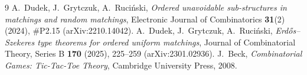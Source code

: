 \documentclass[11pt]{article}
\theoremstyle{definition}
\theoremstyle{plain}
\theoremstyle{remark}
\begin{document}
\begin{thebibliography}{9}
A.~Dudek, J.~Grytczuk, A.~Ruciński,
\emph{Ordered unavoidable sub-structures in matchings and random matchings},
Electronic Journal of Combinatorics \textbf{31}(2) (2024), \#P2.15 (arXiv:2210.14042).
A.~Dudek, J.~Grytczuk, A.~Ruciński,
\emph{Erdős--Szekeres type theorems for ordered uniform matchings},
Journal of Combinatorial Theory, Series B \textbf{170} (2025), 225--259 (arXiv:2301.02936).
J.~Beck,
\emph{Combinatorial Games: Tic-Tac-Toe Theory},
Cambridge University Press, 2008.
\end{thebibliography}
\end{document}
